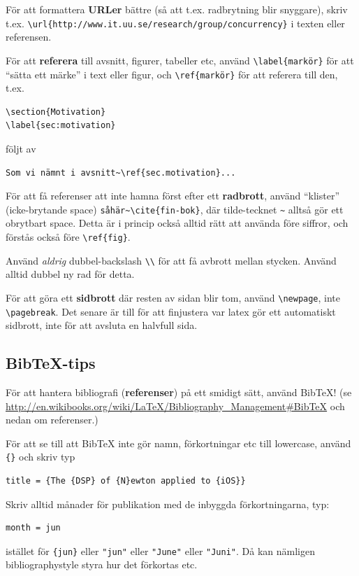 \documentclass[swedish, a4paper,12pt]{article}
\begin{document}
För att formattera \textbf{URLer} bättre (så att t.ex. radbrytning blir snyggare), skriv t.ex. \verb|\url{http://www.it.uu.se/research/group/concurrency}| i texten eller referensen.

För att \textbf{referera} till avsnitt, figurer, tabeller etc, använd \verb|\label{markör}| för att ``sätta ett märke'' i text eller figur, och \verb|\ref{markör}| för att referera till den, t.ex.
\begin{verbatim}
\section{Motivation}
\label{sec:motivation}
\end{verbatim}

följt av
\begin{verbatim}
Som vi nämnt i avsnitt~\ref{sec.motivation}...
\end{verbatim}

För att få referenser att inte hamna först efter ett \textbf{radbrott}, använd ``klister'' (icke-brytande space) \verb|såhär~\cite{fin-bok}|, där tilde-tecknet \verb|~| alltså gör ett obrytbart space. Detta är i princip också alltid rätt att använda före siffror, och förstås också före \verb|\ref{fig}|.

Använd \emph{aldrig} dubbel-backslash \verb|\\| för att få avbrott mellan stycken. Använd alltid dubbel ny rad för detta.

För att göra ett \textbf{sidbrott} där resten av sidan blir tom, använd \verb|\newpage|, inte \verb|\pagebreak|. Det senare är till för att finjustera var latex gör ett automatiskt sidbrott, inte för att avsluta en halvfull sida.

\subsection{Bib\TeX-tips}

För att hantera bibliografi (\textbf{referenser}) på ett smidigt sätt, använd BibTeX! (se \url{http://en.wikibooks.org/wiki/LaTeX/Bibliography_Management#BibTeX} och nedan om referenser.)

För att se till att BibTeX inte gör namn, förkortningar etc till lowercase, använd \verb|{}| och skriv typ
\begin{verbatim}
title = {The {DSP} of {N}ewton applied to {iOS}}
\end{verbatim}

Skriv alltid månader för publikation med de inbyggda förkortningarna, typ:
\begin{verbatim}
month = jun
\end{verbatim}
istället för \verb|{jun}| eller \verb|"jun"| eller \verb|"June"| eller \verb|"Juni"|. Då kan nämligen bibliographystyle styra hur det förkortas etc.
\end{document}
